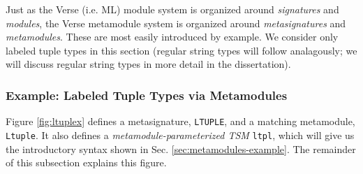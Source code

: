 Just as the Verse (i.e. ML) module system is organized around \emph{signatures} and \emph{modules}, the Verse metamodule system is organized around \emph{metasignatures} and \emph{metamodules}. These are most easily introduced by example. We consider only labeled tuple types in this section (regular string types will follow analagously; we will discuss regular string types in more detail in the dissertation).


\subsubsection{Example: Labeled Tuple Types via Metamodules}

Figure \ref{fig:ltuplex} defines a metasignature, \lstinline{LTUPLE}, and a matching 
metamodule, \lstinline{Ltuple}. It also defines a \emph{metamodule-parameterized TSM} \lstinline{ltpl}, which will give us the introductory syntax shown in Sec. \ref{sec:metamodules-example}. The remainder of this subsection explains this figure.

